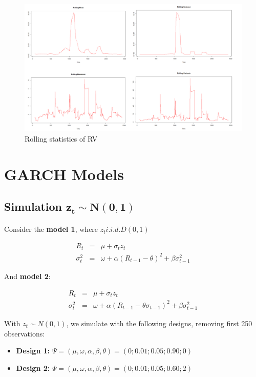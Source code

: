 \documentclass[a4paper]{article}
\begin{document}
\begin{figure}[H]
\centering
\includegraphics[width=1.05\textwidth]{rolling_rv.png}
\caption{\label{fig:roll-rv}Rolling statistics of RV}
\end{figure}


\section{GARCH Models}

\subsection{Simulation $\mathbf{z_t \sim N(0,1)}$}

\paragraph{}
Consider the \textbf{model 1}, where $z_t i.i.d. D(0,1)$

\begin{eqnarray*}
R_t &=& \mu + \sigma_t z_t \\
\sigma_t^2 &=& \omega + \alpha (R_{t-1} - \theta )^2 + \beta \sigma_{t-1}^2
\end{eqnarray*}

And \textbf{model 2}:

\begin{eqnarray*}
R_t &=& \mu + \sigma_t z_t \\
\sigma_t^2 &=& \omega + \alpha (R_{t-1} - \theta \sigma_{t-1})^2 + \beta \sigma_{t-1}^2
\end{eqnarray*}

With $z_t \sim N(0,1)$, we simulate with the following designs, removing first 250 observations:
\begin{itemize}
\item \textbf{Design 1:} $\Psi = (\mu, \omega, \alpha, \beta, \theta) = (0; 0.01; 0.05; 0.90; 0)$
\item \textbf{Design 2:} $\Psi = (\mu, \omega, \alpha, \beta, \theta) = (0; 0.01; 0.05; 0.60; 2)$
\end{itemize}
\end{document}
